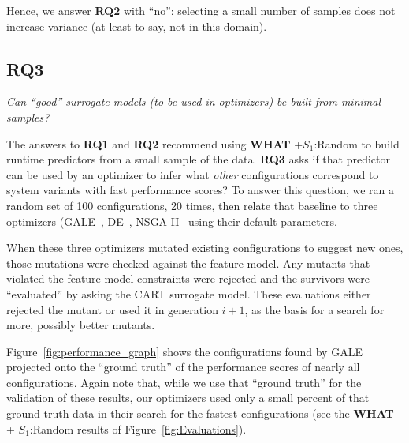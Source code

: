 \documentclass{sig-alternative}
\newcommand{\fig}[1]{Figure~\ref{fig:#1}}
\newcommand{\what}{{\bf WHAT }}
\begin{document}
\begin{myshadowbox}
Hence, we answer {\bf RQ2} with ``no'': selecting a small number of samples does not increase variance (at least to say, not in this domain).
\end{myshadowbox}


\subsection{RQ3}

 {\em
Can ``good'' surrogate models (to be used in optimizers)
be built from minimal samples?}

The answers to {\bf RQ1} and {\bf RQ2} recommend using \what+$S_1$:Random to build runtime predictors from a small sample of the data. {\bf RQ3}
asks if that predictor can be used by an optimizer to infer what {\em other} configurations correspond to system variants with fast performance scores?
To answer this question,  we ran  a random set of 100 
configurations, 20 times, then relate that baseline to three optimizers (GALE~\cite{krall2014gale}, DE~\cite{storn1997differential}, NSGA-II~\cite{deb00afast} using their
default parameters.
 
When these three optimizers mutated existing configurations to suggest new ones,
those mutations were checked against the feature model. Any mutants that violated the feature-model constraints were rejected
and the survivors were ``evaluated'' by asking the CART surrogate model.
These evaluations either rejected the mutant or used it in generation $i+1$, as the basis for a search for more, possibly
better  mutants.

\fig{performance_graph} shows the configurations found by GALE projected onto the ``ground truth'' of the performance scores of nearly
all configurations. Again note that, while we use that ``ground truth'' for the validation of these results, our optimizers 
used only a small percent of that ground truth data in their search for the fastest configurations (see the \what + $S_1$:Random
results of \fig{Evaluations}).
\end{document}

